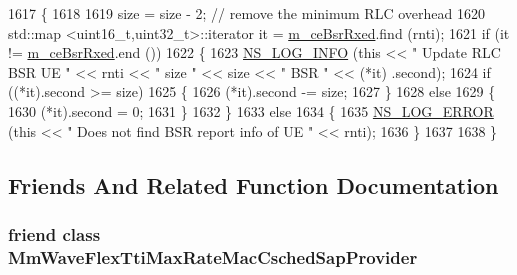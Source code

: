 \begin{DoxyCode}
1617 \{
1618 
1619   size = size - 2; \textcolor{comment}{// remove the minimum RLC overhead}
1620   std::map <uint16\_t,uint32\_t>::iterator it = \hyperlink{classns3_1_1MmWaveFlexTtiMaxRateMacScheduler_a15f595669d44bd9f2715d4c1bcddbb83}{m\_ceBsrRxed}.find (rnti);
1621   \textcolor{keywordflow}{if} (it != \hyperlink{classns3_1_1MmWaveFlexTtiMaxRateMacScheduler_a15f595669d44bd9f2715d4c1bcddbb83}{m\_ceBsrRxed}.end ())
1622     \{
1623       \hyperlink{group__logging_gafbd73ee2cf9f26b319f49086d8e860fb}{NS\_LOG\_INFO} (\textcolor{keyword}{this} << \textcolor{stringliteral}{" Update RLC BSR UE "} << rnti << \textcolor{stringliteral}{" size "} << size << \textcolor{stringliteral}{" BSR "} << (*it)
      .second);
1624       \textcolor{keywordflow}{if} ((*it).second >= size)
1625         \{
1626           (*it).second -= size;
1627         \}
1628       \textcolor{keywordflow}{else}
1629         \{
1630           (*it).second = 0;
1631         \}
1632     \}
1633   \textcolor{keywordflow}{else}
1634     \{
1635       \hyperlink{group__logging_ga0261a8db1d4ac5f79417d117634fd455}{NS\_LOG\_ERROR} (\textcolor{keyword}{this} << \textcolor{stringliteral}{" Does not find BSR report info of UE "} << rnti);
1636     \}
1637 
1638 \}
\end{DoxyCode}


\subsection{Friends And Related Function Documentation}
\subsubsection[{\texorpdfstring{Mm\+Wave\+Flex\+Tti\+Max\+Rate\+Mac\+Csched\+Sap\+Provider}{MmWaveFlexTtiMaxRateMacCschedSapProvider}}]{\setlength{\rightskip}{0pt plus 5cm}friend class {\bf Mm\+Wave\+Flex\+Tti\+Max\+Rate\+Mac\+Csched\+Sap\+Provider}\hspace{0.3cm}{\ttfamily [friend]}}\hypertarget{classns3_1_1MmWaveFlexTtiMaxRateMacScheduler_a036c69652c5bc3af5b73035b6e9e5a8e}{}\label{classns3_1_1MmWaveFlexTtiMaxRateMacScheduler_a036c69652c5bc3af5b73035b6e9e5a8e}
